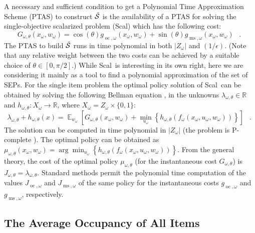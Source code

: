 \documentclass[11pt,a4paper]{article}
\DeclareMathOperator{\E}{\mathbb{E}}
\DeclareMathOperator{\oc}{oc}
\DeclareMathOperator{\ms}{ms}
\DeclareMathOperator{\mf}{\enspace .}
\newcommand{\Pscal}{{\sc Scal}}
\newcommand{\reals}{\mathbb{R}}
\theoremstyle{definition}
\theoremstyle{remark}
\begin{document}
A necessary and sufficient condition \cite{PapadimitriouY00,DiakonikolasY08} to
get a Polynomial Time Approximation Scheme (PTAS) to construct $\hat{\cal{S}}$
is the availability of a PTAS for solving the single-objective scalarized
problem (\Pscal) which has the following cost:
\begin{equation}\label{eqn:psiGtheta}
G_{\omega, \theta}(x_{\omega}, w_{\omega})
= \cos(\theta) g_{\oc, \omega}(x_{\omega}, w_{\omega})
+ \sin(\theta) g_{\ms, \omega}(x_{\omega}, w_{\omega}) \mf
\end{equation}
The PTAS to build $\hat{\cal{S}}$ runs in time polynomial in both $|Z_\omega|$
and $(1/\epsilon)$.
(Note that any relative weight between the two costs can be achieved by a
suitable choice of $\theta \in \left[0, \pi/2\right]$.)
While \Pscal\ is interesting in its own right, here we are considering it mainly
as a tool to find a polynomial approximation of the set of SEPs.
For the single item problem the optimal policy solution of \Pscal\ can be
obtained by solving the following Bellman equation \cite{Bertsekas00}, in the
unknowns $\lambda_{\omega,\theta} \in \reals$ and $h_{\omega,\theta} : X_\omega
\rightarrow \reals$, where $X_\omega = Z_\omega \times \{0,1\}$:
\begin{equation}\label{eqn:bellmanGtheta}
  \lambda_{\omega,\theta} + h_{\omega,\theta}(x) = \E_{w_{\omega}} \left [G_{\omega,
      \theta}(x_{\omega}, w_{\omega}) +
    \min_{u_{\omega}} \left\{h_{\omega,\theta} \left(f_\omega(x_{\omega},
    u_{\omega}, w_{\omega})\right) \right\} \right] \mf
\end{equation}
The solution can be computed in time polynomial in $|Z_\omega|$ (the
problem is P-complete \cite{PapadimitriouT87}). The optimal policy can
be obtained as $\mu_{\omega,\theta}(x_{\omega}, w_{\omega}) =
\arg\min_{u_\omega} \left\{h_{\omega,\theta} \left(f_\omega(x_{\omega},
u_{\omega}, w_{\omega})\right) \right\}$.  From the general theory,
the cost of the optimal policy $\mu_{\omega,\theta}$ (for the
instantaneous cost $G_{\omega, \theta}$) is $J_{\omega,\theta}
=\lambda_{\omega,\theta}$.  Standard methods permit the polynomial
time computation of the values $J_{\oc,\omega}$ and $J_{\ms,\omega}$
of the same policy for the instantaneous costs $g_{\oc, \omega}$ and
$g_{\ms, \omega}$, respectively.


\subsection{The Average Occupancy of All Items}
\label{sec:aver-occup-all}
\end{document}

